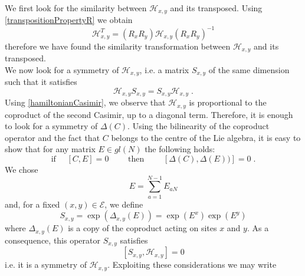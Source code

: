 \documentclass[10pt]{article}
\numberwithin{equation}{section}
\numberwithin{equation}{subsection}
\newcommand{\dt}{\;.}
\begin{document}
We first look for the similarity between $\mathcal{H}_{x,y}$ and its transposed. Using \eqref{transpositionPropertyR} we obtain  
\begin{equation}\label{transpositionPropertyH}
    \mathcal{H}_{x,y}^{T}=\left(R_{x}R_{y}\right)\mathcal{H}_{x,y}\left(R_{x}R_{y}\right)^{-1}
\end{equation}
therefore we have found the similarity transformation between $\mathcal{H}_{x,y}$ and its transposed. \\
We now look for a symmetry of $\mathcal{H}_{x,y}$, i.e. a matrix $S_{x,y}$ of the same dimension such that it satisfies 
\begin{equation}
	\mathcal{H}_{x,y}S_{x,y}=S_{x,y}\mathcal{H}_{x,y}
	\dt
\end{equation}
Using \eqref{hamiltonianCasimir}, we observe that $\mathcal{H}_{x,y}$ is proportional to the coproduct of the second Casimir, up to a diagonal term. Therefore, it is enough to look for a symmetry of $\Delta (C)$. Using the bilinearity of the coproduct operator and the fact that $C$ belongs to the centre of the Lie algebra, it is easy to show that for any matrix $E\in {gl}(N)$ the following holds:
\begin{equation}
 \text{if } \quad	[C,E]=0\qquad  \text{ then }\qquad \left[\Delta (C),\Delta(E)) \right]=0\dt
\end{equation}
We chose 
\begin{equation}
	E=\sum_{a=1}^{N-1}E_{aN}
\end{equation}
and, for a fixed $(x,y)\in \mathcal{E}$, we define
\begin{equation}
	S_{x,y}=\exp{(\Delta_{x,y}(E))}=\exp{(E^{x})}\exp{(E^{y})}
\end{equation}
where $\Delta_{x,y}(E)$ is a copy of the coproduct acting on sites $x$ and $y$. As a consequence, this operator $S_{x,y}$ satisfies
\begin{equation}\label{symmetryH}
	\left[S_{x,y},\mathcal{H}_{x,y}\right]=0
\end{equation}
i.e. it is a symmetry of $\mathcal{H}_{x,y}$. Exploiting these considerations we may write
\end{document}
